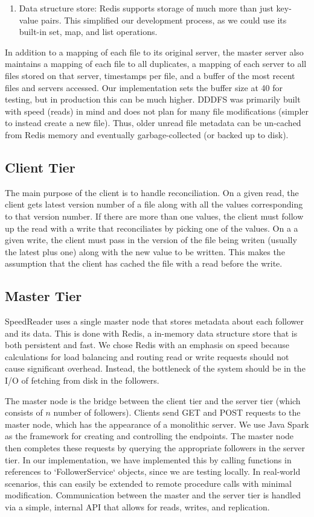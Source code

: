 \documentclass[twoside]{article}
\begin{document}
\begin{multicols}{2}
\begin{enumerate}
	\item Data structure store: Redis supports storage of much more than just key-value pairs. This simplified our development process, as we could use its built-in set, map, and list operations.
\end{enumerate}
In addition to a mapping of each file to its original server, the master server also maintains a mapping of each file to all duplicates, a mapping of each server to all files stored on that server, timestamps per file, and a buffer of the most recent files and servers accessed. Our implementation sets the buffer size at 40 for testing, but in production this can be much higher. DDDFS was primarily built with speed (reads) in mind and does not plan for many file modifications (simpler to instead create a new file). Thus, older unread file metadata can be un-cached from Redis memory and eventually garbage-collected (or backed up to disk).

\subsection*{Client Tier}
The main purpose of the client is to handle reconciliation. On a given read, the client gets latest version number of a file along with all the values corresponding to that version number. If there are more than one values, the client must follow up the read with a write that reconciliates by picking one of the values. On a a given write, the client must pass in the version of the file being writen (usually the latest plus one) along with the new value to be written. This makes the assumption that the client has cached the file with a read before the write. 

\subsection*{Master Tier}
SpeedReader uses a single master node that stores metadata about each follower and its data. This is done with Redis, a in-memory data structure store that is both persistent and fast. We chose Redis with an emphasis on speed because calculations for load balancing and routing read or write requests should not cause significant overhead. Instead, the bottleneck of the system should be in the I/O of fetching from disk in the followers. 

The master node is the bridge between the client tier and the server tier (which consists of $n$ number of followers). Clients send GET and POST requests to the master node, which has the appearance of a monolithic server. We use Java Spark as the framework for creating and controlling the endpoints. The master node then completes these requests by querying the appropriate followers in the server tier. In our implementation, we have implemented this by calling functions in references to `FollowerService` objects, since we are testing locally. In real-world scenarios, this can easily be extended to remote procedure calls with minimal modification. Communication between the master and the server tier is handled via a simple, internal API that allows for reads, writes, and replication. 


\end{multicols}
\end{document}
